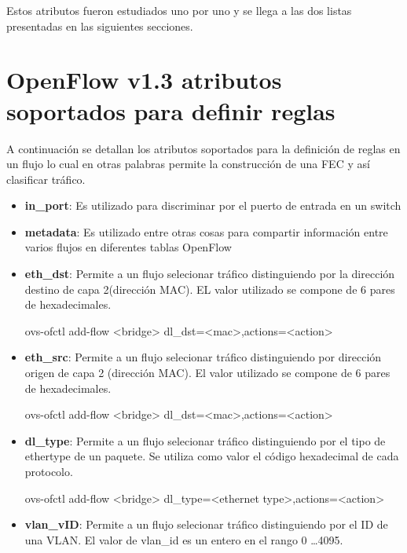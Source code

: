 Estos atributos fueron estudiados uno por uno y se llega a las dos listas presentadas en las siguientes secciones.

\section{OpenFlow v1.3 atributos soportados para definir reglas}

A continuaci\'on se detallan los atributos soportados para la definici\'on de reglas en un flujo lo cual en otras palabras permite la construcci\'on de una FEC y así clasificar tr\'afico.

\begin{itemize}

\item \textbf{in\_port}: Es utilizado para discriminar por el puerto de entrada en un switch

\item \textbf{metadata}: Es utilizado entre otras cosas para compartir informaci\'on entre varios flujos en diferentes tablas OpenFlow

\item \textbf{eth\_dst}: Permite a un flujo selecionar tr\'afico distinguiendo por la direcci\'on destino de capa 2(dirección MAC). EL valor utilizado se compone de 6 pares de hexadecimales.

\begin{center}
ovs-ofctl add-flow <bridge> dl\_dst=<mac>,actions=<action>
\end{center}

\item \textbf{eth\_src}: Permite a un flujo selecionar tr\'afico distinguiendo por direcci\'on origen de capa 2 (direcci\'on MAC). El valor utilizado se compone de 6 pares de hexadecimales.

\begin{center}
ovs-ofctl add-flow <bridge> dl\_dst=<mac>,actions=<action>
\end{center}

\item \textbf{dl\_type}: Permite a un flujo selecionar tr\'afico distinguiendo por el tipo de ethertype de un paquete. Se utiliza como valor el c\'odigo hexadecimal de cada protocolo.

\begin{center}
ovs-ofctl add-flow <bridge> dl\_type=<ethernet type>,actions=<action>
\end{center}

\item \textbf{vlan\_vID}: Permite a un flujo selecionar tr\'afico distinguiendo por el ID de una VLAN. El valor de vlan\_id es un entero en el rango 0 \dots 4095.


\end{itemize}
